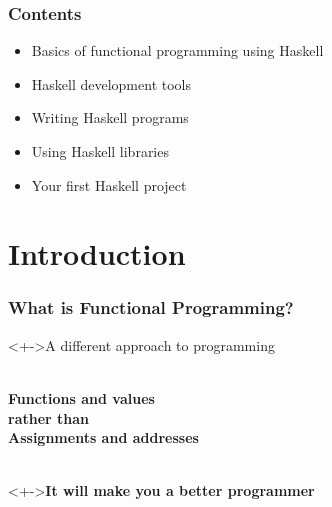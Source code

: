 \documentclass{beamer}
\subtitle{Part I}
\date{Uder, 30.05.2019}
\begin{document}
\begin{frame}
  \titlepage
\end{frame}



\begin{frame}
  \frametitle{Contents}
  \begin{itemize}
  \item Basics of functional programming using Haskell
  \item Haskell development tools
  \item Writing Haskell programs
  \item Using Haskell libraries
  \item Your first Haskell project
  \end{itemize}
\end{frame}


\section{Introduction}
\begin{frame}
  \frametitle{What is Functional Programming?}
  \begin{block}<+->{A different approach to programming}
    \begin{LARGE}
      \begin{center}\bf
        ~
        \\[1ex]
        Functions and values
        \\[2ex]
        {\normalsize rather than}
        \\[2ex]
        Assignments and addresses
        \\[1ex]
        ~
      \end{center}
    \end{LARGE}
  \end{block}
  \begin{alertblock}<+->{\bf It will make you a better programmer}
    ~
  \end{alertblock}
\end{frame} 
\end{document}
